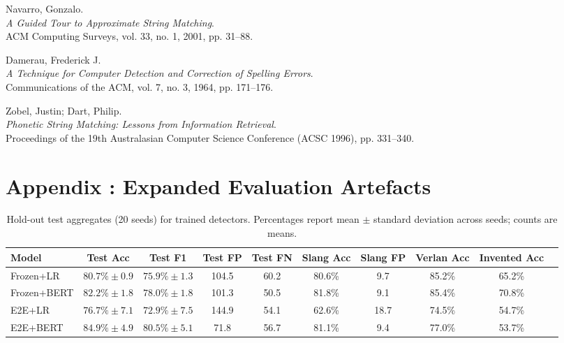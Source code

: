 \documentclass[12pt]{article}
\begin{document}
\begin{thebibliography}{9}
Navarro, Gonzalo.\\
\textit{A Guided Tour to Approximate String Matching}.\\
ACM Computing Surveys, vol. 33, no. 1, 2001, pp. 31--88.

Damerau, Frederick J.\\
\textit{A Technique for Computer Detection and Correction of Spelling Errors}.\\
Communications of the ACM, vol. 7, no. 3, 1964, pp. 171--176.

Zobel, Justin; Dart, Philip.\\
\textit{Phonetic String Matching: Lessons from Information Retrieval}.\\
Proceedings of the 19th Australasian Computer Science Conference (ACSC 1996), pp. 331--340.

\end{thebibliography}



\appendix

\section{Appendix \thesection: Expanded Evaluation Artefacts}

\begin{table}[H]
    \centering
    \footnotesize
    \begin{tabular}{lccccccccc}
        \hline
        Model & Test Acc & Test F1 & Test FP & Test FN & Slang Acc & Slang FP & Verlan Acc & Invented Acc \\
        \hline
        Frozen+LR & $80.7\%\pm0.9$ & $75.9\%\pm1.3$ & 104.5 & 60.2 & 80.6\% & 9.7 & 85.2\% & 65.2\% \\
        Frozen+BERT & $82.2\%\pm1.8$ & $78.0\%\pm1.8$ & 101.3 & 50.5 & 81.8\% & 9.1 & 85.4\% & 70.8\% \\
        E2E+LR & $76.7\%\pm7.1$ & $72.9\%\pm7.5$ & 144.9 & 54.1 & 62.6\% & 18.7 & 74.5\% & 54.7\% \\
        E2E+BERT & $84.9\%\pm4.9$ & $80.5\%\pm5.1$ & 71.8 & 56.7 & 81.1\% & 9.4 & 77.0\% & 53.7\% \\
        \hline
    \end{tabular}
    \caption{Hold-out test aggregates (20 seeds) for trained detectors. Percentages report mean $\pm$ standard deviation across seeds; counts are means.}
    \label{tab:appendix-holdout-aggregates}
\end{table}
\end{document}
